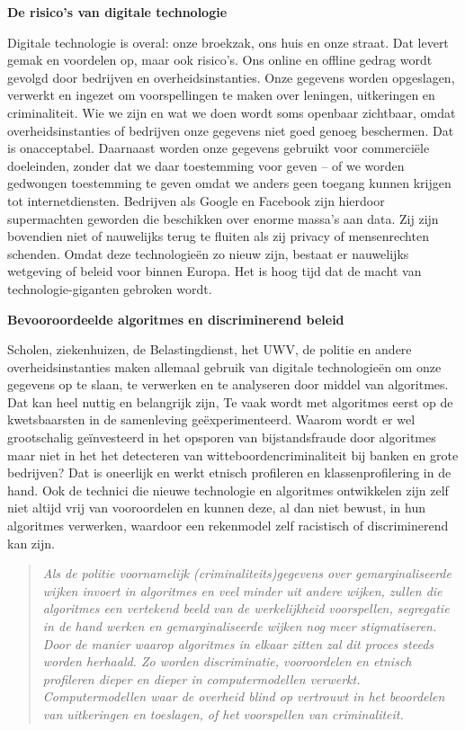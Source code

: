 \textbf{De risico's van digitale technologie}

Digitale technologie is overal: onze broekzak, ons huis en onze straat.
Dat levert gemak en voordelen op, maar ook risico's. Ons online en
offline gedrag wordt gevolgd door bedrijven en overheidsinstanties. Onze
gegevens worden opgeslagen, verwerkt en ingezet om voorspellingen te
maken over leningen, uitkeringen en criminaliteit. Wie we zijn en wat we
doen wordt soms openbaar zichtbaar, omdat overheidsinstanties of
bedrijven onze gegevens niet goed genoeg beschermen. Dat is
onacceptabel. Daarnaast worden onze gegevens gebruikt voor commerciële
doeleinden, zonder dat we daar toestemming voor geven -- of we worden
gedwongen toestemming te geven omdat we anders geen toegang kunnen
krijgen tot internetdiensten. Bedrijven als Google en Facebook zijn
hierdoor supermachten geworden die beschikken over enorme massa's aan
data. Zij zijn bovendien niet of nauwelijks terug te fluiten als zij
privacy of mensenrechten schenden. Omdat deze technologieën zo nieuw
zijn, bestaat er nauwelijks wetgeving of beleid voor binnen Europa. Het
is hoog tijd dat de macht van technologie-giganten gebroken wordt.

\textbf{Bevooroordeelde algoritmes en discriminerend beleid}

Scholen, ziekenhuizen, de Belastingdienst, het UWV, de politie en andere
overheidsinstanties maken allemaal gebruik van digitale technologieën om
onze gegevens op te slaan, te verwerken en te analyseren door middel van
algoritmes. Dat kan heel nuttig en belangrijk zijn, Te vaak wordt met
algoritmes eerst op de kwetsbaarsten in de samenleving geëxperimenteerd.
Waarom wordt er wel grootschalig geïnvesteerd in het opsporen van
bijstandsfraude door algoritmes maar niet in het het detecteren van
witteboordencriminaliteit bij banken en grote bedrijven? Dat is
oneerlijk en werkt etnisch profileren en klassenprofilering in de hand.
Ook de technici die nieuwe technologie en algoritmes ontwikkelen zijn
zelf niet altijd vrij van vooroordelen en kunnen deze, al dan niet
bewust, in hun algoritmes verwerken, waardoor een rekenmodel zelf
racistisch of discriminerend kan zijn.

\begin{quote}
\emph{Als de politie voornamelijk (criminaliteits)gegevens over
gemarginaliseerde wijken invoert in algoritmes en veel minder uit andere
wijken, zullen die algoritmes een vertekend beeld van de werkelijkheid
voorspellen, segregatie in de hand werken en gemarginaliseerde wijken
nog meer stigmatiseren. Door de manier waarop algoritmes in elkaar
zitten zal dit proces steeds worden herhaald. Zo worden discriminatie,
vooroordelen en etnisch profileren dieper en dieper in computermodellen
verwerkt. Computermodellen waar de overheid blind op vertrouwt in het
beoordelen van uitkeringen en toeslagen, of het voorspellen van
criminaliteit.}
\end{quote}

